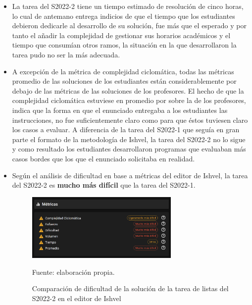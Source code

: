 \documentclass[letterpaper,12pt]{article}
\begin{document}
\begin{itemize}
  \item La tarea del S2022-2 tiene un tiempo estimado de resolución de cinco horas, lo cual de antemano entrega indicios de que el tiempo que los estudiantes debieron dedicarle al desarrollo de su solución, fue más que el esperado y por tanto el añadir la complejidad de gestionar sus horarios académicos y el tiempo que consumían otros ramos, la situación en la que desarrollaron la tarea pudo no ser la más adecuada.
  \item A excepción de la métrica de complejidad ciclomática, todas las métricas promedio de las soluciones de los estudiantes están considerablemente por debajo de las métricas de las soluciones de los profesores. El hecho de que la complejidad ciclomática estuviese en promedio por sobre la de los profesores, indica que la forma en que el enunciado entregaba a los estudiantes las instrucciones, no fue suficientemente claro como para que éstos tuviesen claro los casos a evaluar. A diferencia de la tarea del S2022-1 que seguía en gran parte el formato de la metodología de Ishvel, la tarea del S2022-2 no lo sigue y como resultado los estudiantes desarrollaron programas que evaluaban más casos bordes que los que el enunciado solicitaba en realidad.
  \item Según el análisis de dificultad en base a métricas del editor de Ishvel, la tarea del S2022-2 es \textbf{mucho más difícil} que la tarea del S2022-1.
        \begin{figure}[H]
          \centering
          \includegraphics[width=0.7\textwidth]{figures/metricstList2.png}
          \caption{Comparación de dificultad de la solución de la tarea de listas del S2022-2 en el editor de Ishvel} Fuente: elaboración propia.
          \label{img:metricsList2}
        \end{figure}
\end{itemize}
\end{document}
